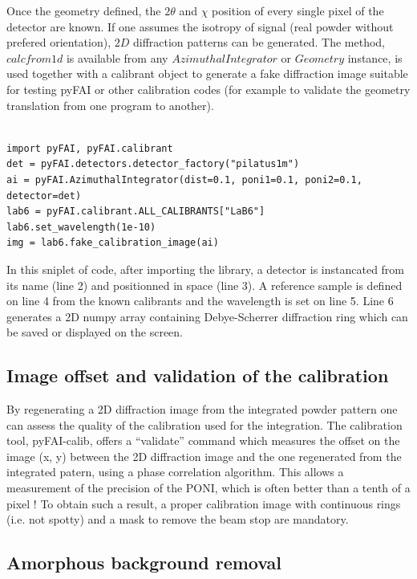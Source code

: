 \documentclass[preprint]{iucr}
\begin{document}
Once the geometry defined, the $2\theta$ and $\chi$ position of every single
pixel of the detector are known.
If one assumes the isotropy of signal (real powder without prefered
orientation), $2D$ diffraction patterns can be generated.
The method, $calcfrom1d$ is available from any $Azimuthal Integrator$ or
$Geometry$ instance, is used together with a calibrant object
to generate a fake diffraction image suitable for testing pyFAI or other 
calibration codes (for example to validate the geometry translation from one
program to another).

\begin{verbatim}

import pyFAI, pyFAI.calibrant
det = pyFAI.detectors.detector_factory("pilatus1m")
ai = pyFAI.AzimuthalIntegrator(dist=0.1, poni1=0.1, poni2=0.1, detector=det)
lab6 = pyFAI.calibrant.ALL_CALIBRANTS["LaB6"]
lab6.set_wavelength(1e-10)
img = lab6.fake_calibration_image(ai)
\end{verbatim}

In this sniplet of code, after importing the library, a detector is instancated
from its name (line 2) and positionned in space (line 3).
A reference sample is defined on line 4 from the known calibrants and the
wavelength is set on line 5. Line 6 generates a 2D numpy array containing
Debye-Scherrer diffraction ring which can be saved or displayed on the screen.

\subsection{Image offset and validation of the calibration}
By regenerating a 2D diffraction image from the integrated powder pattern one
can assess the quality of the calibration used for the integration.
The calibration tool, pyFAI-calib, offers  a ``validate'' command which measures
the offset on the image (x, y) between the 2D diffraction image and the one
regenerated from the integrated patern, using a phase correlation algorithm.
This allows a measurement of the precision of the PONI, which is often better
than a tenth of a pixel !
To obtain such a result, a proper calibration image with continuous rings (i.e.
not spotty) and a mask to remove the beam stop are mandatory.

\subsection{Amorphous background removal}
\end{document}
